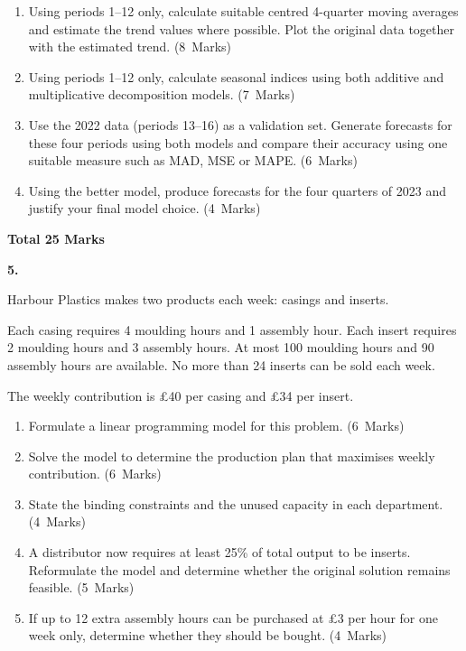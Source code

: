 \documentclass[11pt,a4paper]{article}
\newcommand{\markalloc}[1]{\nobreak\hfill\mbox{(#1 Marks)}}
\newcommand{\questiontotal}[1]{\begin{flushright}\textbf{Total #1 Marks}\end{flushright}}
\begin{document}
\begin{enumerate}
\item Using periods 1--12 only, calculate suitable centred 4-quarter moving averages and estimate the trend values where possible. Plot the original data together with the estimated trend. \markalloc{8}

\item Using periods 1--12 only, calculate seasonal indices using both additive and multiplicative decomposition models. \markalloc{7}

\item Use the 2022 data (periods 13--16) as a validation set. Generate forecasts for these four periods using both models and compare their accuracy using one suitable measure such as MAD, MSE or MAPE. \markalloc{6}

\item Using the better model, produce forecasts for the four quarters of 2023 and justify your final model choice. \markalloc{4}
\end{enumerate}

\questiontotal{25}

\newpage

\textbf{5.}

Harbour Plastics makes two products each week: casings and inserts.

Each casing requires 4 moulding hours and 1 assembly hour.
Each insert requires 2 moulding hours and 3 assembly hours.
At most 100 moulding hours and 90 assembly hours are available.
No more than 24 inserts can be sold each week.

The weekly contribution is \pounds40 per casing and \pounds34 per insert.

\begin{enumerate}
\item Formulate a linear programming model for this problem. \markalloc{6}

\item Solve the model to determine the production plan that maximises weekly contribution. \markalloc{6}

\item State the binding constraints and the unused capacity in each department. \markalloc{4}

\item A distributor now requires at least 25\% of total output to be inserts. Reformulate the model and determine whether the original solution remains feasible. \markalloc{5}

\item If up to 12 extra assembly hours can be purchased at \pounds3 per hour for one week only, determine whether they should be bought. \markalloc{4}
\end{enumerate}
\end{document}
